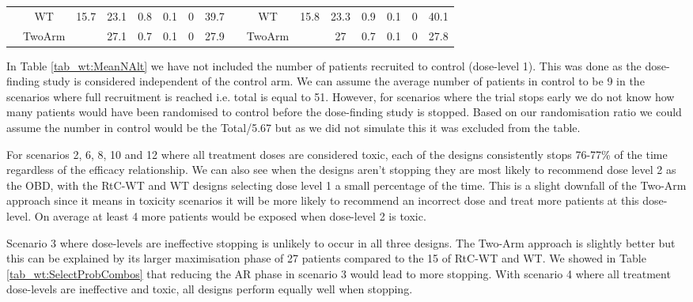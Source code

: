 \begin{table}
{\begin{tabular}[t]{ccccccc>{}c|cccccccc}
			& WT & 15.7 & 23.1 & 0.8 & 0.1 & 0 & 39.7 &  & WT & 15.8 & 23.3 & 0.9 & 0.1 & 0 & 40.1\\
			
			\multirow{-3}{*}{\centering\arraybackslash 6} & TwoArm &  & 27.1 & 0.7 & 0.1 & 0 & 27.9 & \multirow{-3}{*}{\centering\arraybackslash 12} & TwoArm &  & 27 & 0.7 & 0.1 & 0 & 27.8\\
			\bottomrule
	\end{tabular}}
\end{table}

 In Table \ref{tab_wt:MeanNAlt} we have not included the number of patients recruited to control (dose-level 1). This was done as the dose-finding study is considered independent of the control arm. We can assume the average number of patients in control to be 9 in the scenarios where full recruitment is reached i.e. total is equal to 51. However, for scenarios where the trial stops early we do not know how many patients would have been randomised to control before the dose-finding study is stopped. Based on our randomisation ratio we could assume the number in control would be the Total/5.67 but as we did not simulate this it was excluded from the table. 
 
 For scenarios 2, 6, 8, 10 and 12 where all treatment doses are considered toxic, each of the designs consistently stops 76-77\% of the time regardless of the efficacy relationship. We can also see when the designs aren't stopping they are most likely to recommend dose level 2 as the OBD, with the RtC-WT and WT designs selecting dose level 1 a small percentage of the time. This is a slight downfall of the Two-Arm approach since it means in toxicity scenarios it will be more likely to recommend an incorrect dose and treat more patients at this dose-level. On average at least 4 more patients would be exposed when dose-level 2 is toxic. 
 
 Scenario 3 where dose-levels are ineffective stopping is unlikely to occur in all three designs. The Two-Arm approach is slightly better but this can be explained by its larger maximisation phase of 27 patients compared to the 15 of RtC-WT and WT. We showed in Table \ref{tab_wt:SelectProbCombos} that reducing the AR phase in scenario 3 would lead to more stopping. With scenario 4 where all treatment dose-levels are ineffective and toxic, all designs perform equally well when stopping. 
 
